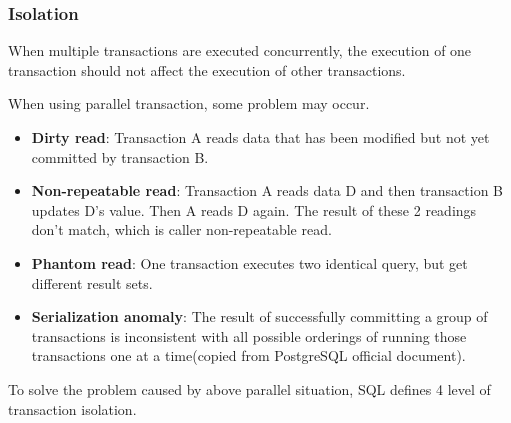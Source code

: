 \documentclass[onecolumn, oneside, ctexart, UTF8, b4paper]{SUSTechHomework}
\newcommand{\upcite}[1]{\textsuperscript{\textsuperscript{\cite{#1}}}}
\begin{document}
 \subsubsection{\textbf{Isolation}}
When multiple transactions are executed concurrently, the execution of one transaction should not affect the execution of other transactions.

When using parallel transaction, some problem may occur.

\begin{itemize}[itemindent=2em]
    \item \textbf{Dirty read}: Transaction A reads data that has been modified but not yet committed by transaction B.
    \item \textbf{Non-repeatable read}: Transaction A reads data D and then transaction B updates D's value. Then A reads D again. The result of these 2 readings don't match, which is caller non-repeatable read.
    \item \textbf{Phantom read}: One transaction executes two identical query, but get different result sets.
    \item \textbf{Serialization anomaly}: The result of successfully committing a group of transactions is inconsistent with all possible orderings of running those transactions one at a time(copied from PostgreSQL official document).
\end{itemize}

To solve the problem caused by above parallel situation, SQL defines 4 level of transaction isolation\upcite{ref3}.
\end{document}
